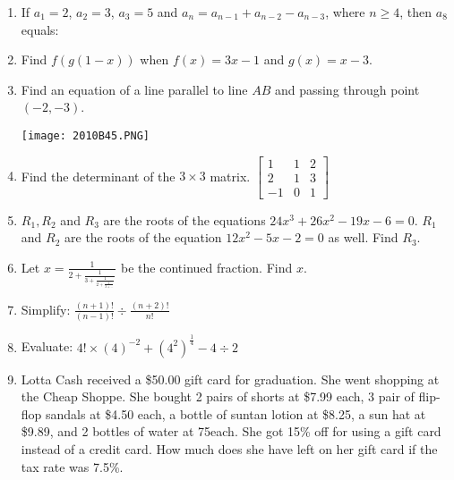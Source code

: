 \documentclass[../uilmath.tex]{subfiles}
\begin{document}
\begin{enumerate}[label=\bfseries\arabic*.]
        \item %
        If $a_1=2$, $a_2=3$, $a_3=5$ and $a_n=a_{n-1}+a_{n-2}-a_{n-3}$, where $n\geq 4$, then $a_8$ equals:

        \item %
        Find $f(g(1-x))$ when $f(x)=3x-1$ and $g(x)=x-3$.

        \item %
        Find an equation of a line parallel to line $AB$ and passing through point $(-2,-3)$.
        \begin{center}
            \texttt{[image: 2010B45.PNG]}
        \end{center}

        \item %
        Find the determinant of the $3\times 3$ matrix.
        $\begin{bmatrix}
            1 & 1 & 2 \\
            2 & 1 & 3 \\
            -1 & 0 & 1
        \end{bmatrix}$

        \item %
        $R_1, R_2$ and $R_3$ are the roots of the equations $24x^3+26x^2-19x-6=0$. $R_1$ and $R_2$ are the roots of the equation 
        $12x^2-5x-2=0$ as well. Find $R_3$.

        \item %
        Let $x=\frac{1}{2+\frac{1}{3+\frac{1}{2+\frac{1}{3+\dots}}}}$ be the continued fraction. Find $x$.

        \item %
        Simplify: $\frac{(n+1)!}{(n-1)!}\div \frac{(n+2)!}{n!}$

        \item %
        Evaluate: $4!\times (4)^{-2}+(4^2)^{\frac{1}{4}}-4\div 2$

        \item %
        Lotta Cash received a \$50.00 gift card for graduation. She went shopping at the Cheap Shoppe. She bought 2 pairs of shorts at \$7.99 each, 3 pair of flip-flop 
        sandals at \$4.50 each, a bottle of suntan lotion at \$8.25, a sun hat at \$9.89, and 2 bottles of water at 75\textcent  each. She got 15\% off for using a gift card 
        instead of a credit card. How much does she have left on her gift card if the tax rate was 7.5\%.
        

\end{enumerate}
\end{document}
